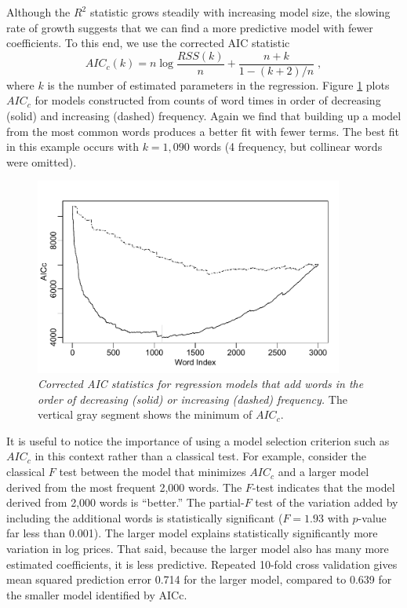 \documentclass[12pt]{article}
\begin{document}
Although the $R^2$ statistic grows steadily with increasing model size, the slowing rate of growth suggests that we can find a more predictive model with fewer coefficients.  To this end, we use the corrected AIC statistic \citep{hurvich89}
\begin{equation}
    AIC_{c}(k) = n \log \frac{RSS(k)}{n} + \frac{n+k}{1-(k+2)/n} \;,
\end{equation}
where $k$ is the number of estimated parameters in the regression.  Figure \ref{fig:aicwords} plots $AIC_c$ for models constructed from counts of word times in order of decreasing (solid) and increasing (dashed) frequency.  Again we find that building up a model from the most common words produces a better fit with fewer terms.  The best fit in this example occurs with $k=1,090$ words (4 frequency, but collinear words were omitted).


\begin{figure}
\caption{  \label{fig:aicwords}  
  {\sl Corrected AIC statistics for regression models that add words in the order of decreasing (solid) or increasing (dashed) frequency.}  The vertical gray segment shows the minimum of $AIC_c$.}
  \centerline{ \includegraphics[width=4in]{figures/aic_words.pdf} }
\end{figure}


It is useful to notice the importance of using a model selection criterion such as $AIC_c$ in this context rather than a classical test.  For example, consider the classical $F$ test between the  model that minimizes $AIC_c$ and a larger model derived from the most frequent 2,000 words.  The $F$-test indicates that the model derived from 2,000 words is ``better.''  The  partial-$F$ test of the variation added by including the additional words is statistically significant ($F = 1.93$ with $p$-value far less than 0.001).  The larger model explains statistically significantly more variation in log prices.  That said, because the larger model also has many more estimated coefficients, it is less predictive.  Repeated 10-fold cross validation gives mean squared prediction error 0.714 for the larger model, compared to 0.639 for the smaller model identified by AICc.
\end{document}
